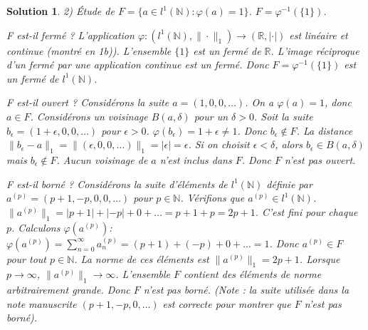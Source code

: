 \documentclass{article}
\newtheorem{solution}{Solution}
\begin{document}
\begin{solution}
2) Étude de $F = \{a \in l^1(\mathbb{N}) : \varphi(a) = 1\}$.
$F = \varphi^{-1}(\{1\})$.

F est-il fermé ?
L'application $\varphi: (l^1(\mathbb{N}), \|\cdot\|_1) \to (\mathbb{R}, |\cdot|)$ est linéaire et continue (montré en 1b)).
L'ensemble $\{1\}$ est un fermé de $\mathbb{R}$.
L'image réciproque d'un fermé par une application continue est un fermé.
Donc $F = \varphi^{-1}(\{1\})$ est un fermé de $l^1(\mathbb{N})$.

F est-il ouvert ?
Considérons la suite $a = (1, 0, 0, \dots)$. On a $\varphi(a) = 1$, donc $a \in F$.
Considérons un voisinage $B(a, \delta)$ pour un $\delta > 0$.
Soit la suite $b_\epsilon = (1+\epsilon, 0, 0, \dots)$ pour $\epsilon > 0$.
$\varphi(b_\epsilon) = 1+\epsilon \neq 1$. Donc $b_\epsilon \notin F$.
La distance $\|b_\epsilon - a\|_1 = \|(\epsilon, 0, 0, \dots)\|_1 = |\epsilon| = \epsilon$.
Si on choisit $\epsilon < \delta$, alors $b_\epsilon \in B(a, \delta)$ mais $b_\epsilon \notin F$.
Aucun voisinage de $a$ n'est inclus dans $F$.
Donc $F$ n'est pas ouvert.

F est-il borné ?
Considérons la suite d'éléments de $l^1(\mathbb{N})$ définie par $a^{(p)} = (p+1, -p, 0, 0, \dots)$ pour $p \in \mathbb{N}$.
Vérifions que $a^{(p)} \in l^1(\mathbb{N})$. $\|a^{(p)}\|_1 = |p+1| + |-p| + 0 + \dots = p+1+p = 2p+1$. C'est fini pour chaque $p$.
Calculons $\varphi(a^{(p)})$:
$\varphi(a^{(p)}) = \sum_{n=0}^\infty a_n^{(p)} = (p+1) + (-p) + 0 + \dots = 1$.
Donc $a^{(p)} \in F$ pour tout $p \in \mathbb{N}$.
La norme de ces éléments est $\|a^{(p)}\|_1 = 2p+1$.
Lorsque $p \to \infty$, $\|a^{(p)}\|_1 \to \infty$.
L'ensemble $F$ contient des éléments de norme arbitrairement grande.
Donc $F$ n'est pas borné.
(Note : la suite utilisée dans la note manuscrite $(p+1, -p, 0, \dots)$ est correcte pour montrer que $F$ n'est pas borné).

\end{solution}
\end{document}
